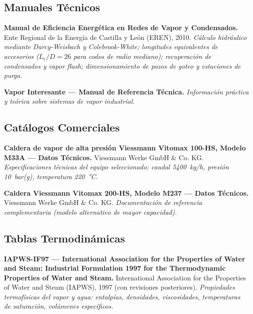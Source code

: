 \subsection*{Manuales Técnicos}

\begin{enumerate}[label={[\arabic*]}, leftmargin=2em, resume]
	\item \textbf{Manual de Eficiencia Energética en Redes de Vapor y Condensados.}
	      Ente Regional de la Energía de Castilla y León (EREN), 2010.
	      \textit{Cálculo hidráulico mediante Darcy-Weisbach y Colebrook-White; longitudes equivalentes de accesorios ($L_e/D = 26$ para codos de radio mediano); recuperación de condensados y vapor flash; dimensionamiento de pozos de goteo y estaciones de purga.}

	\item \textbf{Vapor Interesante --- Manual de Referencia Técnica.}
	      \textit{Información práctica y teórica sobre sistemas de vapor industrial.}
\end{enumerate}

\subsection*{Catálogos Comerciales}

\begin{enumerate}[label={[\arabic*]}, leftmargin=2em, resume]
	\item \textbf{Caldera de vapor de alta presión Viessmann Vitomax 100-HS, Modelo M33A --- Datos Técnicos.}
	      Viessmann Werke GmbH \& Co. KG.
	      \textit{Especificaciones técnicas del equipo seleccionado: caudal 5400~kg/h, presión 10~bar(g), temperatura 220~°C.}

	\item \textbf{Caldera Viessmann Vitomax 200-HS, Modelo M237 --- Datos Técnicos.}
	      Viessmann Werke GmbH \& Co. KG.
	      \textit{Documentación de referencia complementaria (modelo alternativo de mayor capacidad).}
\end{enumerate}

\subsection*{Tablas Termodinámicas}

\begin{enumerate}[label={[\arabic*]}, leftmargin=2em, resume]
	\item \textbf{IAPWS-IF97 --- International Association for the Properties of Water and Steam: Industrial Formulation 1997 for the Thermodynamic Properties of Water and Steam.}
	      International Association for the Properties of Water and Steam (IAPWS), 1997 (con revisiones posteriores).
	      \textit{Propiedades termofísicas del vapor y agua: entalpías, densidades, viscosidades, temperaturas de saturación, volúmenes específicos.}
\end{enumerate}

